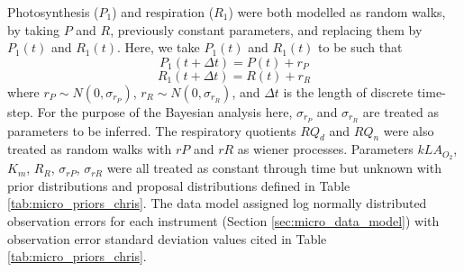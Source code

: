 \documentclass{ruthesis}
\begin{document}
Photosynthesis ($P_1$) and respiration ($R_1$) were both modelled as random walks, by taking \begin{math}P\end{math} and \begin{math}R\end{math}, previously constant parameters, and replacing them by \begin{math}P_1(t)\end{math} and \begin{math}R_1(t)\end{math}. Here, we take \begin{math}P_1(t)\end{math} and \begin{math}R_1(t)\end{math} to be such that
\begin{displaymath}
P_1(t+\Delta t) = P(t) + r_P
\end{displaymath}
\begin{displaymath}
R_1(t+\Delta t) = R(t) + r_R
\end{displaymath}
where \begin{math}
r_P \sim N(0, \sigma_{r_P})
\end{math}, \begin{math}
r_R \sim N(0, \sigma_{r_R})
\end{math}, and \begin{math}
\Delta t
\end{math} is the length of discrete time-step. For the purpose of the Bayesian analysis here, \begin{math}\sigma_{r_P}\end{math} and \begin{math}\sigma_{r_R}\end{math} are treated as parameters to be inferred. The respiratory quotients $RQ_d$ and $RQ_n$ were also treated as random walks with $rP$ and $rR$ as wiener processes. 
Parameters $kLA_{O_2}$, $K_m$, $R_R$, $\sigma_{rP}$, $\sigma_{rR}$ were all treated as constant through time but unknown with prior distributions and proposal distributions defined in Table \ref{tab:micro_priors_chris}.
The data model assigned log normally distributed observation errors for each instrument (Section \ref{sec:micro_data_model}) with observation error standard deviation values cited in Table \ref{tab:micro_priors_chris}.
\end{document}
